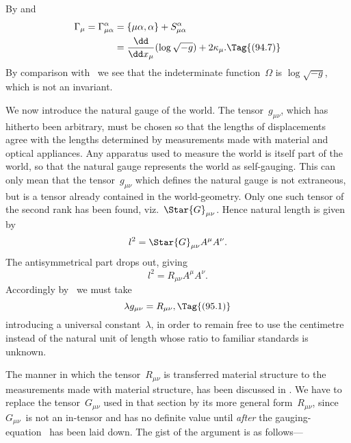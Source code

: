 \documentclass[12pt]{book}
\begin{document}
By  and~
\begin{align*}
  \Gamma_{\mu} = \Gamma_{\mu\alpha}^{\alpha}
  &= \{\mu\alpha, \alpha\} + S_{\mu\alpha}^{\alpha} \\
  &= \frac{\dd}{\dd x_{\mu}} (\log \sqrt{-g}) + 2\kappa_{\mu}.
  \Tag{(94.7)}
\end{align*}
By comparison with~ we see that the indeterminate function~$\Omega$ is
$\log \sqrt{-g}$, which is not an invariant.

%
%

We now introduce the natural gauge of the world. The tensor~$g_{\mu\nu}$, which
has hitherto been arbitrary, must be chosen so that the lengths of displacements
agree with the lengths determined by measurements made with material
and optical appliances. Any apparatus used to measure the world is itself part
of the world, so that the natural gauge represents the world as self-gauging.
%
This can only mean that the tensor~$g_{\mu\nu}$ which defines the natural gauge is
not extraneous, but is a tensor already contained in the world-geometry. Only
one such tensor of the second rank has been found, viz.~$\Star{G}_{\mu\nu}$. Hence natural
length is given by
\[
l^{2} = \Star{G}_{\mu\nu} A^{\mu} A^{\nu}.
\]
The antisymmetrical part drops out, giving
\[
l^{2} = R_{\mu\nu} A^{\mu} A^{\nu}.
\]
Accordingly by~ we must take
\[
\lambda g_{\mu\nu} = R_{\mu\nu},
\Tag{(95.1)}
\]
introducing a universal constant~$\lambda$, in order to remain free to use the centimetre
instead of the natural unit of length whose ratio to familiar standards
is unknown.

The manner in which the tensor~$R_{\mu\nu}$ is transferred  material structure
to the measurements made with material structure, has been discussed in
. We have to replace the tensor~$G_{\mu\nu}$ used in that section by its more
general form~$R_{\mu\nu}$, since $G_{\mu\nu}$~is not an in-tensor and has no definite value
until \emph{after} the gauging-equation~ has been laid down. The gist of the
argument is as follows---
\end{document}
